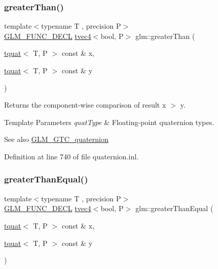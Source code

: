 \subsubsection{\texorpdfstring{greaterThan()}{greaterThan()}}
{\footnotesize\ttfamily template$<$typename T , precision P$>$ \\
\mbox{\hyperlink{setup_8hpp_ab2d052de21a70539923e9bcbf6e83a51}{G\+L\+M\+\_\+\+F\+U\+N\+C\+\_\+\+D\+E\+CL}} \mbox{\hyperlink{structglm_1_1tvec4}{tvec4}}$<$bool, P$>$ glm\+::greater\+Than (\begin{DoxyParamCaption}\item[{\mbox{\hyperlink{structglm_1_1tquat}{tquat}}$<$ T, P $>$ const \&}]{x,  }\item[{\mbox{\hyperlink{structglm_1_1tquat}{tquat}}$<$ T, P $>$ const \&}]{y }\end{DoxyParamCaption})}

Returns the component-\/wise comparison of result x $>$ y.


\begin{DoxyTemplParams}{Template Parameters}
{\em quat\+Type} & Floating-\/point quaternion types.\\
\hline
\end{DoxyTemplParams}
\begin{DoxySeeAlso}{See also}
\mbox{\hyperlink{group__gtc__quaternion}{G\+L\+M\+\_\+\+G\+T\+C\+\_\+quaternion}} 
\end{DoxySeeAlso}


Definition at line 740 of file quaternion.\+inl.

\mbox{\label{group__gtc__quaternion_ga0906a221a2037519fcf316ea5c1e3b3e}} 
\subsubsection{\texorpdfstring{greaterThanEqual()}{greaterThanEqual()}}
{\footnotesize\ttfamily template$<$typename T , precision P$>$ \\
\mbox{\hyperlink{setup_8hpp_ab2d052de21a70539923e9bcbf6e83a51}{G\+L\+M\+\_\+\+F\+U\+N\+C\+\_\+\+D\+E\+CL}} \mbox{\hyperlink{structglm_1_1tvec4}{tvec4}}$<$bool, P$>$ glm\+::greater\+Than\+Equal (\begin{DoxyParamCaption}\item[{\mbox{\hyperlink{structglm_1_1tquat}{tquat}}$<$ T, P $>$ const \&}]{x,  }\item[{\mbox{\hyperlink{structglm_1_1tquat}{tquat}}$<$ T, P $>$ const \&}]{y }\end{DoxyParamCaption})}


